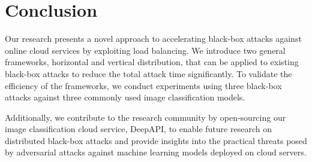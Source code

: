 \section{Conclusion}

Our research presents a novel approach to accelerating black-box attacks against online cloud services by exploiting load balancing. We introduce two general frameworks, horizontal and vertical distribution, that can be applied to existing black-box attacks to reduce the total attack time significantly. To validate the efficiency of the frameworks, we conduct experiments using three black-box attacks against three commonly used image classification models.

Additionally, we contribute to the research community by open-sourcing our image classification cloud service, DeepAPI, to enable future research on distributed black-box attacks and provide insights into the practical threats posed by adversarial attacks against machine learning models deployed on cloud servers.








